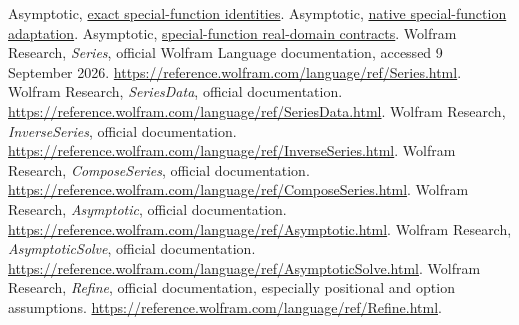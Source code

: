 \documentclass[11pt,letterpaper]{article}
\newcommand{\src}[2]{\href{https://github.com/VladimirReshetnikov/Asymptotic/blob/921387e5ba1239bfda96e63e64e89bf63d9c41e6/#1}{#2}}
\begin{document}
\begin{thebibliography}{99}
 Asymptotic, \src{AsymptoticInverse/Kernel/SpecialFunctionIdentities.wl}{exact special-function identities}.
 Asymptotic, \src{AsymptoticInverse/Kernel/NativeSpecialFunctions.wl}{native special-function adaptation}.
 Asymptotic, \src{AsymptoticInverse/Kernel/SpecialFunctionRealDomain.wl}{special-function real-domain contracts}.
 Wolfram Research, \emph{Series}, official Wolfram Language documentation, accessed 9 September 2026. \url{https://reference.wolfram.com/language/ref/Series.html}.
 Wolfram Research, \emph{SeriesData}, official documentation. \url{https://reference.wolfram.com/language/ref/SeriesData.html}.
 Wolfram Research, \emph{InverseSeries}, official documentation. \url{https://reference.wolfram.com/language/ref/InverseSeries.html}.
 Wolfram Research, \emph{ComposeSeries}, official documentation. \url{https://reference.wolfram.com/language/ref/ComposeSeries.html}.
 Wolfram Research, \emph{Asymptotic}, official documentation. \url{https://reference.wolfram.com/language/ref/Asymptotic.html}.
 Wolfram Research, \emph{AsymptoticSolve}, official documentation. \url{https://reference.wolfram.com/language/ref/AsymptoticSolve.html}.
 Wolfram Research, \emph{Refine}, official documentation, especially positional and option assumptions. \url{https://reference.wolfram.com/language/ref/Refine.html}.
\end{thebibliography}
\end{document}
